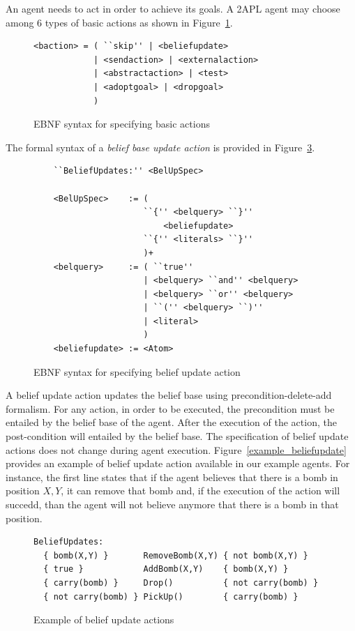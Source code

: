 \documentclass[a4paper]{article}
\begin{document}
An agent needs to act in order to achieve its goals. A 2APL agent may choose among 6 types of basic actions as shown in Figure~\ref{fig:ebnf_actions}.

\begin{figure}[htp]
\begin{verbatim}
<baction> = ( ``skip'' | <beliefupdate>
            | <sendaction> | <externalaction> 
            | <abstractaction> | <test>
            | <adoptgoal> | <dropgoal>
            )
\end{verbatim}
\caption{EBNF syntax for specifying basic actions}
\label{fig:ebnf_actions}
\end{figure}

The formal syntax of a \emph{belief base update action} is provided in Figure~\ref{fig:ebnf_beliefupdate}.

\begin{figure}[htp]
\begin{verbatim}
	``BeliefUpdates:'' <BelUpSpec>
	
	<BelUpSpec>    := (
	                  ``{'' <belquery> ``}''
	                      <beliefupdate>
	                  ``{'' <literals> ``}''
	                  )+
	<belquery>     := ( ``true'' 
	                  | <belquery> ``and'' <belquery>
	                  | <belquery> ``or'' <belquery>
	                  | ``('' <belquery> ``)''
	                  | <literal>
	                  )
	<beliefupdate> := <Atom>
\end{verbatim}
\caption{EBNF syntax for specifying belief update action}
\label{fig:ebnf_beliefupdate}
\end{figure}

A belief update action updates the belief base using precondition-delete-add formalism. For any action, in order to be executed, the precondition must be entailed by the belief base of the agent. After the execution of the action, the post-condition will entailed by the belief base. The specification of belief update actions does not change during agent execution. Figure~\ref{example_beliefupdate} provides an example of belief update action available in our example agents. For instance, the first line states that if the agent believes that there is a bomb in position $X,Y$, it can remove that bomb and, if the execution of the action will succedd, than the agent will not believe anymore that there is a bomb in that position.

\begin{figure}[htp]
\begin{verbatim}
BeliefUpdates:
  { bomb(X,Y) }       RemoveBomb(X,Y) { not bomb(X,Y) }
  { true }            AddBomb(X,Y)    { bomb(X,Y) }
  { carry(bomb) }     Drop()          { not carry(bomb) }
  { not carry(bomb) } PickUp()        { carry(bomb) }
\end{verbatim}
\caption{Example of belief update actions}
\label{fig:ebnf_beliefupdate}
\end{figure}
\end{document}
